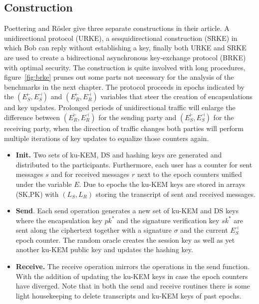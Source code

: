 \documentclass[11pt,a4paper,twoside,openright,bibliography=totoc]{scrbook}
\begin{document}
\subsection{Construction}
\label{sec:construction}

Poettering and Rösler give three separate constructions in their article.
A unidirectional protocol (URKE), a sesquidirectional construction (SRKE) in which
Bob can reply without establishing a key, finally both URKE and SRKE
are used to create a bidirectional asynchronous key-exchange protocol (BRKE)
with optimal security. The construction is quite involved with long
procedures, figure~\ref{fig:brke} prunes out some parts not necessary for the
analysis of the benchmarks in the next chapter. The protocol proceeds
in epochs indicated by the $(E_S^\vdash,E_S^\dashv)$ and $(E_R^\vdash,E_R^\dashv)$
variables that steer the creation of encapsulations and key updates.
Prolonged periods of unidirectional traffic will enlarge the
difference between $(E_R^\vdash,E_R^\dashv)$ for the sending
party and $(E_S^\vdash,E_S^\dashv)$ for the receiving party, when
the direction of traffic changes both parties will perform
multiple iterations of key updates to equalize those counters again.

\begin{itemize}
\item \textbf{Init.} Two sets of ku-KEM, DS and hashing keys are generated
  and distributed to the participants. Furthermore, each user has a counter
  for sent messages $s$ and for received messages $r$ next to the epoch
  counters unified under the variable $E$. Due to epochs the ku-KEM keys
  are stored in arrays (SK,PK) with $(L_S,L_R)$ storing the transcript
  of sent and received messages.
\item \textbf{Send}. Each send operation generates a new set of
  ku-KEM and DS keys where the encapsulation key $pk^*$ and the
  signature verification key $sk^*$ are sent along the ciphertext
  together with a signature $\sigma$ and the current $E_S^\dashv$ epoch
  counter. The random oracle creates the session key as well as yet another
  ku-KEM public key and updates the hashing key.
\item \textbf{Receive.} The receive operation mirrors the
  operations in the send function. With the addition
  of updating the ku-KEM keys in case the epoch counters have diverged.
  Note that in both the send and receive routines there is some light
  housekeeping to delete transcripts and ku-KEM keys of past
  epochs.
\end{itemize}
\end{document}
